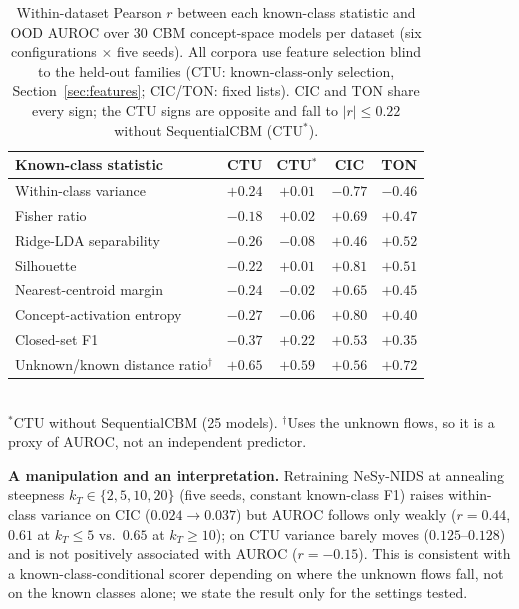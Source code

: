 \documentclass[journal]{IEEEtran}
\begin{document}
\begin{table}[t]
\centering\footnotesize
\caption{Within-dataset Pearson $r$ between each known-class statistic and OOD AUROC over 30 CBM concept-space models per dataset (six configurations $\times$ five seeds). All corpora use feature selection blind to the held-out families (CTU: known-class-only selection, Section~\ref{sec:features}; CIC/TON: fixed lists). CIC and TON share every sign; the CTU signs are opposite and fall to $|r|\le0.22$ without SequentialCBM (CTU$^\ast$).}
\label{tab:signflip}
\setlength{\tabcolsep}{5pt}\renewcommand{\arraystretch}{0.92}
\begin{tabular}{lcccc}
\toprule
Known-class statistic & CTU & CTU$^\ast$ & CIC & TON \\
\midrule
Within-class variance        & $+0.24$ & $+0.01$ & $-0.77$ & $-0.46$ \\
Fisher ratio                 & $-0.18$ & $+0.02$ & $+0.69$ & $+0.47$ \\
Ridge-LDA separability       & $-0.26$ & $-0.08$ & $+0.46$ & $+0.52$ \\
Silhouette                   & $-0.22$ & $+0.01$ & $+0.81$ & $+0.51$ \\
Nearest-centroid margin      & $-0.24$ & $-0.02$ & $+0.65$ & $+0.45$ \\
Concept-activation entropy   & $-0.27$ & $-0.06$ & $+0.80$ & $+0.40$ \\
Closed-set F1                & $-0.37$ & $+0.22$ & $+0.53$ & $+0.35$ \\
\midrule
Unknown/known distance ratio$^\dagger$ & $+0.65$ & $+0.59$ & $+0.56$ & $+0.72$ \\
\bottomrule
\end{tabular}\\[2pt]
{\footnotesize $^\ast$CTU without SequentialCBM (25 models). $^\dagger$Uses the unknown flows, so it is a proxy of AUROC, not an independent predictor.}
\end{table}

\textbf{A manipulation and an interpretation.} Retraining NeSy-NIDS at annealing steepness $k_T\in\{2,5,10,20\}$ (five seeds, constant known-class F1) raises within-class variance on CIC ($0.024{\to}0.037$) but AUROC follows only weakly ($r{=}0.44$, $0.61$ at $k_T{\le}5$ vs.\ $0.65$ at $k_T{\ge}10$); on CTU variance barely moves ($0.125$--$0.128$) and is not positively associated with AUROC ($r{=}-0.15$). This is consistent with a known-class-conditional scorer depending on where the unknown flows fall, not on the known classes alone; we state the result only for the settings tested.
\end{document}
